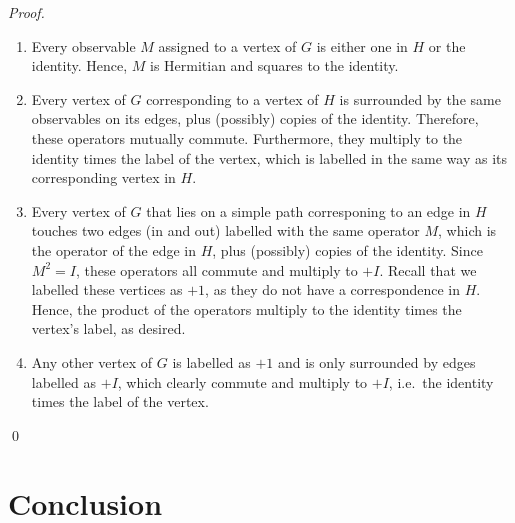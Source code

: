 \documentclass{llncs}
\begin{document}
\begin{proof}
  \begin{enumerate}
  \item Every observable \(M\) assigned to a vertex of \(G\) is either one in \(H\) or
    the identity. Hence, \(M\) is Hermitian and squares to the identity.

  \item Every vertex of \(G\) corresponding to a vertex of \(H\) is
    surrounded by the same observables on its edges, plus (possibly)
    copies of the identity. Therefore, these operators mutually
    commute. Furthermore, they multiply to the identity times the
    label of the vertex, which is labelled in the same way as its
    corresponding vertex in \(H\).

  \item Every vertex of \(G\) that lies on a simple path corresponing
    to an edge in \(H\) touches two edges (in and out) labelled with
    the same operator \(M\), which is the operator of the edge in
    \(H\), plus (possibly) copies of the identity. Since
    \(M^{2} = I\), these operators all commute and multiply to
    \(+I\). Recall that we labelled these vertices as \(+1\), as they
    do not have a correspondence in \(H\). Hence, the product of the
    operators multiply to the identity times the vertex's label, as
    desired.

  \item Any other vertex of \(G\) is labelled as \(+1\) and is only
    surrounded by edges labelled as \(+I\), which clearly commute
    and multiply to \(+I\), i.e.\ the identity times the label of the vertex.
  \end{enumerate}
  \qed
\end{proof}

\section{Conclusion}\label{sec:conc}

\printbibliography{}
\end{document}
